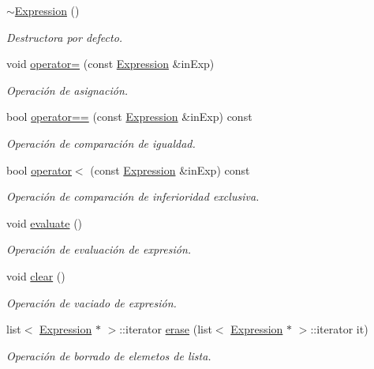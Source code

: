 \begin{DoxyCompactItemize}
\hyperlink{class_expression_a3e99570b177da619eeb2c5787cbb148e}{$\sim$\+Expression} ()
\begin{DoxyCompactList}\small\item\em Destructora por defecto. \end{DoxyCompactList}\item 
void \hyperlink{class_expression_a962312da1eebebaada8517daa02b8070}{operator=} (const \hyperlink{class_expression}{Expression} \&in\+Exp)
\begin{DoxyCompactList}\small\item\em Operación de asignación. \end{DoxyCompactList}\item 
bool \hyperlink{class_expression_a8cd982884bef615b9c79526dce0956f6}{operator==} (const \hyperlink{class_expression}{Expression} \&in\+Exp) const 
\begin{DoxyCompactList}\small\item\em Operación de comparación de igualdad. \end{DoxyCompactList}\item 
bool \hyperlink{class_expression_a4f1f64418752d14e116f55b7b57355b8}{operator$<$} (const \hyperlink{class_expression}{Expression} \&in\+Exp) const 
\begin{DoxyCompactList}\small\item\em Operación de comparación de inferioridad exclusiva. \end{DoxyCompactList}\item 
void \hyperlink{class_expression_a907c90971da33ed6eae071178a6b15a6}{evaluate} ()
\begin{DoxyCompactList}\small\item\em Operación de evaluación de expresión. \end{DoxyCompactList}\item 
void \hyperlink{class_expression_ab2e0ccb0146cccd559c39f8913f9585e}{clear} ()
\begin{DoxyCompactList}\small\item\em Operación de vaciado de expresión. \end{DoxyCompactList}\item 
list$<$ \hyperlink{class_expression}{Expression} $\ast$ $>$\+::iterator \hyperlink{class_expression_aadecbbd3374a578d539afd653d9773f8}{erase} (list$<$ \hyperlink{class_expression}{Expression} $\ast$ $>$\+::iterator it)
\begin{DoxyCompactList}\small\item\em Operación de borrado de elemetos de lista. \end{DoxyCompactList}\item 

\end{DoxyCompactItemize}
